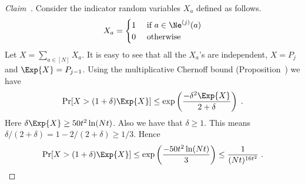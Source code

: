 \begin{proof}[Claim~]  Consider the indicator random variables $X_a$ defined as follows.
    \[
    X_a=\begin{cases}
        1 & \text{ if }a\in \Ne^{(j)}(a)\\
        0 &\text{ otherwise}
    \end{cases}    
    \]
    Let $X=\sum_{a\in [N]}X_a$. It is easy to see that all the $X_a$'s are independent, $X=P_j$ and $\Exp{X}=P_{j-1}$. Using the multiplicative Chernoff bound (Proposition~) we have
    \[
    \Pr[X>(1+\delta)\Exp{X}] \leq \exp\left(\frac{-\delta^2\Exp{X}}{2+\delta}\right)\;.
    \]
    Here $\delta\Exp{X}\geq 50t^2\ln(Nt)$. Also we have that
    $\delta\geq 1$.
    This means
    $\delta/(2+\delta)=1-2/(2+\delta)\geq 1/3$.
    Hence
    \[
        \Pr[X>(1+\delta)\Exp{X}] \leq \exp\left(\frac{-50t^2\ln(Nt)}{3}\right)\leq \frac{1}{(Nt)^{16t^2}}\;.
    \]
\end{proof}
